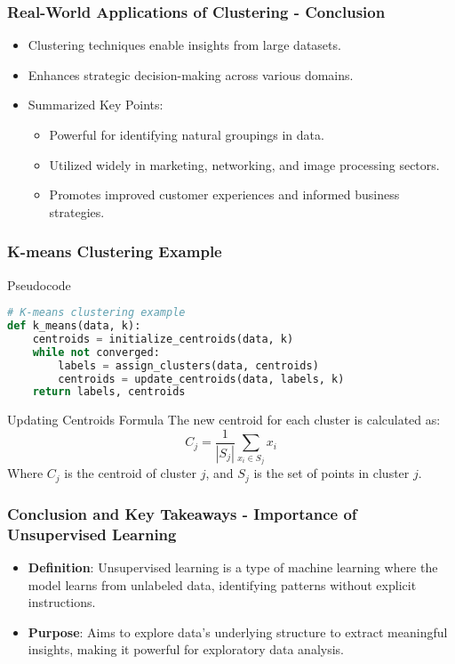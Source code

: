 \documentclass{beamer}
\begin{document}
\begin{frame}[fragile]
    \frametitle{Real-World Applications of Clustering - Conclusion}
    \begin{itemize}
        \item Clustering techniques enable insights from large datasets.
        \item Enhances strategic decision-making across various domains.
        \item Summarized Key Points:
            \begin{itemize}
                \item Powerful for identifying natural groupings in data.
                \item Utilized widely in marketing, networking, and image processing sectors.
                \item Promotes improved customer experiences and informed business strategies.
            \end{itemize}
    \end{itemize}
\end{frame}

\begin{frame}[fragile]
    \frametitle{K-means Clustering Example}
    \begin{block}{Pseudocode}
    \begin{lstlisting}[language=python]
# K-means clustering example
def k_means(data, k):
    centroids = initialize_centroids(data, k)
    while not converged:
        labels = assign_clusters(data, centroids)
        centroids = update_centroids(data, labels, k)
    return labels, centroids
    \end{lstlisting}
    \end{block}
    
    \begin{block}{Updating Centroids Formula}
    The new centroid for each cluster is calculated as:
    \begin{equation}
        C_j = \frac{1}{|S_j|} \sum_{x_i \in S_j} x_i
    \end{equation}
    Where \( C_j \) is the centroid of cluster \( j \), and \( S_j \) is the set of points in cluster \( j \).
    \end{block}
\end{frame}

\begin{frame}[fragile]
    \frametitle{Conclusion and Key Takeaways - Importance of Unsupervised Learning}
    \begin{itemize}
        \item \textbf{Definition}: Unsupervised learning is a type of machine learning where the model learns from unlabeled data, identifying patterns without explicit instructions.
        \item \textbf{Purpose}: Aims to explore data's underlying structure to extract meaningful insights, making it powerful for exploratory data analysis.
    \end{itemize}
\end{frame}
\end{document}
